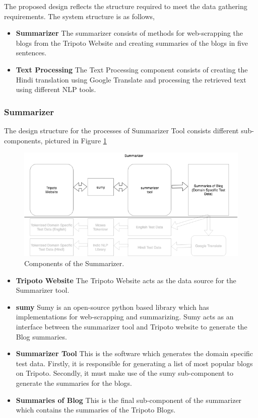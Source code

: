 The proposed design reflects the structure required to meet the data gathering requirements. The system structure is as follows,

\begin{itemize}
    \item \textbf{Summarizer} The summarizer consists of methods for web-scrapping the blogs from the Tripoto Website and creating summaries of the blogs in five sentences.
    \item \textbf{Text Processing} The Text Processing component consists of creating the Hindi translation using Google Translate and processing the retrieved text using different NLP tools.
\end{itemize}

\subsubsection{Summarizer}
The design structure for the processes of Summarizer Tool consists different sub-components, pictured in Figure \ref{summarizer2}

\begin{figure}[h]
\includegraphics[width=\textwidth]{figures/design5.png}
\caption{Components of the Summarizer.} \label{summarizer2}
\end{figure}

\begin{itemize}
    \item \textbf{Tripoto Website} The Tripoto Website acts as the data source for the Summarizer tool. 
    \item \textbf{sumy} Sumy is an open-source python based library which has implementations for web-scrapping and summarizing. Sumy acts as an interface between the summarizer tool and Tripoto website to generate the Blog summaries.
    \item \textbf{Summarizer Tool} This is the software which generates the domain specific test data. Firstly, it is responsible for generating a list of most popular blogs on Tripoto. Secondly, it must make use of the sumy sub-component to generate the summaries for the blogs.
    \item \textbf{Summaries of Blog} This is the final sub-component of the summarizer which contains the summaries of the Tripoto Blogs.
\end{itemize} 

